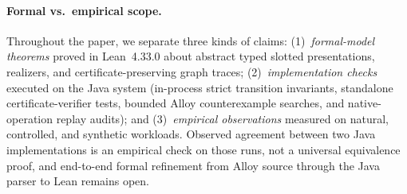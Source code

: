 \paragraph{Formal vs.\ empirical scope.}
Throughout the paper, we separate three kinds of claims:
(1)~\emph{formal-model theorems} proved in Lean~4.33.0 about abstract typed
slotted presentations, realizers, and certificate-preserving graph traces;
(2)~\emph{implementation checks} executed on the Java system (in-process strict
transition invariants, standalone certificate-verifier tests, bounded Alloy
counterexample searches, and native-operation replay audits); and
(3)~\emph{empirical observations} measured on natural, controlled, and synthetic
workloads. Observed agreement between two Java implementations is an empirical
check on those runs, not a universal equivalence proof, and end-to-end formal
refinement from Alloy source through the Java parser to Lean remains open.
